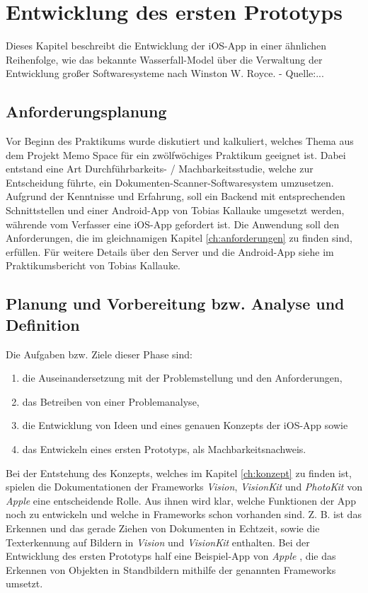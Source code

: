 \documentclass[nomenclature, oneside, 150]{HSMW-Thesis}
\begin{document}

\chapter{Entwicklung des ersten Prototyps}
	Dieses Kapitel beschreibt die Entwicklung der iOS-App in einer ähnlichen Reihenfolge, wie das bekannte Wasserfall-Model über die Verwaltung der Entwicklung großer Softwaresysteme nach Winston W. Royce. - Quelle:...
	
	\section{Anforderungsplanung}
	Vor Beginn des Praktikums wurde diskutiert und kalkuliert, welches Thema aus dem Projekt Memo Space für ein zwölfwöchiges Praktikum geeignet ist. Dabei entstand eine Art Durchführbarkeits- / Machbarkeitsstudie, welche zur Entscheidung führte, ein Dokumenten-Scanner-Softwaresystem umzusetzen. Aufgrund der Kenntnisse und Erfahrung, soll ein Backend mit entsprechenden Schnittstellen und einer Android-App von Tobias Kallauke umgesetzt werden, währende vom Verfasser eine iOS-App gefordert ist. Die Anwendung soll den Anforderungen, die im gleichnamigen Kapitel \ref{ch:anforderungen} zu finden sind, erfüllen. Für weitere Details über den Server und die Android-App siehe im Praktikumsbericht von Tobias Kallauke.

	\section{Planung und Vorbereitung bzw. Analyse und Definition}
		Die Aufgaben bzw. Ziele dieser Phase sind:
		\begin{enumerate}
			\item die Auseinandersetzung mit der Problemstellung und den Anforderungen,
			\item das Betreiben von einer Problemanalyse,
			\item die Entwicklung von Ideen und eines genauen Konzepts der iOS-App sowie 
			\item das Entwickeln eines ersten Prototyps, als Machbarkeitsnachweis.
		\end{enumerate}
		
		Bei der Entstehung des Konzepts, welches im Kapitel \ref{ch:konzept} zu finden ist, spielen die Dokumentationen der Frameworks \textit{Vision}, \textit{VisionKit} und \textit{PhotoKit} von \textit{Apple} eine entscheidende Rolle. Aus ihnen wird klar, welche Funktionen der App noch zu entwickeln und welche in Frameworks schon vorhanden sind. Z. B. ist das Erkennen und das gerade Ziehen von Dokumenten in Echtzeit, sowie die Texterkennung auf Bildern in \textit{Vision} und \textit{VisionKit} enthalten. Bei der Entwicklung des ersten Prototyps half eine Beispiel-App von \textit{Apple} \cite{noauthor_detecting_nodate}, die das Erkennen von Objekten in Standbildern mithilfe der genannten Frameworks umsetzt.
		
\end{document}
